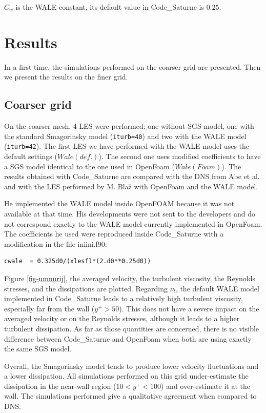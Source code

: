 \documentclass[a4paper]{article}
\newcommand{\CS}{%
   {\fontfamily{ppl}\fontshape{it}\selectfont Code\_Saturne}\xspace}
\begin{document}
$C_w$ is the WALE constant, its default value in \CS is $0.25$.

\section{Results}
In a first time, the simulations performed on the coarser grid are presented. Then we present the results on the finer grid.

\subsection{Coarser grid}
On the coarser mesh, 4 LES were performed: one without SGS model, one with the standard Smagorinsky model (\verb!iturb=40!) and two with the WALE model (\verb!iturb=42!). The first LES we have performed with the WALE model uses the default settings ($Wale(def.)$). The second one uses modified coefficients to have a SGS model identical to the one used in OpenFoam ($Wale(Foam)$). The results obtained with \CS are compared with the DNS from Abe et al. and with the LES performed by M. Bla\v{z} with OpenFoam and the WALE model.

He implemented the WALE model inside OpenFOAM because it was not available at that time. His developments were not sent to the developers and do not correspond exactly to the WALE model currently implemented in OpenFoam. The coefficients he used were reproduced inside \CS with a modification in the file iniini.f90:
\begin{verbatim}
cwale  = 0.325d0/(xlesfl*(2.d0**0.25d0))
\end{verbatim}

Figure \ref{fig-umnurij}, the averaged velocity, the turbulent viscosity, the Reynolds stresses, and the dissipations are plotted. Regarding $\nu_t$, the default WALE model implemented in \CS leads to a relatively high turbulent viscosity, especially far from the wall ($y^+ > 50$). This does not have a severe impact on the averaged velocity or on the Reynolds stresses, although it leads to a higher turbulent dissipation. As far as those quantities are concerned, there is no visible difference between \CS and OpenFoam when both are using exactly the same SGS model.

Overall, the Smagorinsky model tends to produce lower velocity fluctuations and a lower dissipation. All simulations performed on this grid under-estimate the dissipation in the near-wall region ($10 < y^+ < 100$) and over-estimate it at the wall. The simulations performed give a qualitative agreement when compared to DNS.
\end{document}
